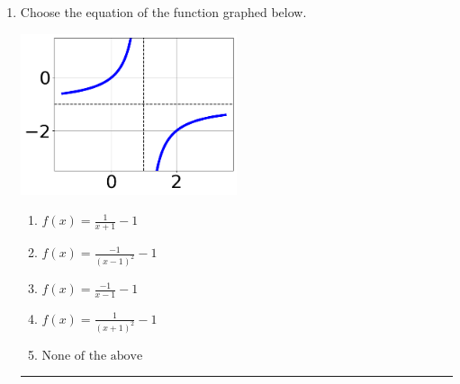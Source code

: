 \documentclass[14pt]{extbook}
\newcommand{\litem}[1]{\item#1\hspace*{-1cm}\rule{\textwidth}{0.4pt}}
\begin{document}
\begin{enumerate}
{\begin{enumerate}[label=\Alph*.]
\end{enumerate} }
\litem{
Choose the equation of the function graphed below.
\begin{center}
    \includegraphics[width=0.5\textwidth]{../Figures/rationalGraphToEquationCopyA.png}
\end{center}
\begin{enumerate}[label=\Alph*.]
\item \( f(x) = \frac{1}{x + 1} - 1 \)
\item \( f(x) = \frac{-1}{(x - 1)^2} - 1 \)
\item \( f(x) = \frac{-1}{x - 1} - 1 \)
\item \( f(x) = \frac{1}{(x + 1)^2} - 1 \)
\item \( \text{None of the above} \)

\end{enumerate} }
\end{enumerate}
\end{document}
